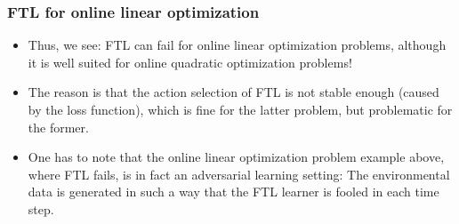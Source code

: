 \documentclass[11pt,compress,t,notes=noshow, xcolor=table]{beamer}
\begin{document}
\begin{frame} \frametitle{FTL for online linear optimization}
	\begin{itemize}
		\small
		\item Thus, we see: FTL can fail for {\color{red} online linear optimization problems}, although it is well suited for {\color{blue}  online quadratic optimization problems}!
		\item The reason is that the action selection of FTL is not stable enough (caused by the loss function), which is fine for {\color{blue} the latter problem}, but problematic for {\color{red} the former}.
		\item One has to note that the online linear optimization problem example above, where FTL fails, is in fact an adversarial learning setting: The environmental data is generated in such a way that the FTL learner is fooled in each time step.
	\end{itemize}
\end{frame}




%
\endlecture
\end{document}
